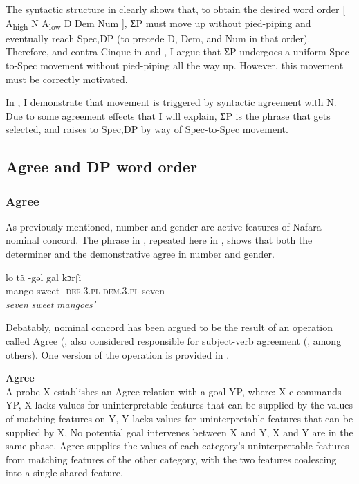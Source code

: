 \documentclass[output=paper]{langscibook}
\begin{document}
The syntactic structure in  clearly shows that, to obtain the desired word order [ A\textsubscript{high} N A\textsubscript{low} D Dem Num ], ƩP must move up without pied-piping and eventually reach Spec,DP (to precede D, Dem, and Num in that order). Therefore, and contra Cinque in  and , I argue that ƩP undergoes a uniform Spec-to-Spec movement without pied-piping all the way up. However, this movement must be correctly motivated. 

In , I demonstrate that movement is triggered by syntactic agreement with N. Due to some agreement effects that I will explain, ƩP is the phrase that gets selected, and raises to Spec,DP by way of Spec-to-Spec movement.
 
\subsection{Agree and DP word order}
\label{sec:baron:2.3}
\subsubsection{Agree}

As previously mentioned, number and gender are active features of Nafara nominal concord. The phrase in , repeated here in , shows that both the determiner and the demonstrative agree in number and gender. 


\ea\label{ex:baron:17}
lo tã -gəl gal kɔrʃi\\
   mango sweet -\textsc{def.3.pl} \textsc{dem.3.pl} seven\\
 \textit{seven} \textit{sweet} \textit{mangoes’}
\z

Debatably, nominal concord has been argued to be the result of an operation called Agree (\citealt{Chomsky2000,Chomsky2001}, also considered responsible for subject-verb agreement (\citealt{Baker2008,Carstens2001,Collins2004}, among others). One version of the operation is provided in .


\begin{exe}\ex\label{ex:baron:18}
\textbf{Agree} \citep[(26)]{Norris2014}\\
A probe X establishes an Agree relation with a goal YP, where:
\xlista
\ex X c-commands YP,
\ex X lacks values for uninterpretable features that can be supplied by the values of  matching features on Y, 
\ex Y lacks values for uninterpretable features that can be supplied by X, 
\ex No potential goal intervenes between X and Y, 
\ex X and Y are in the same phase.
\endxlista
Agree supplies the values of each category’s uninterpretable features from matching features of the other category, with the two features coalescing into a single shared feature.
\end{exe}
\end{document}
